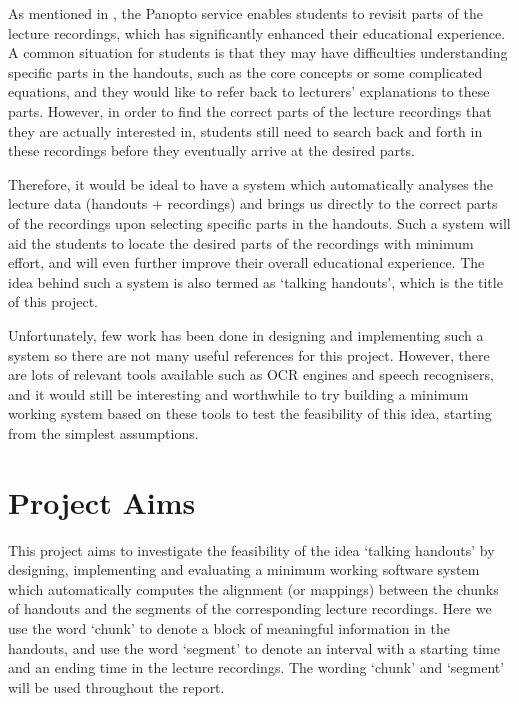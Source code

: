 As mentioned in , the Panopto service enables students to revisit parts of the lecture recordings, which has significantly enhanced their educational experience. A common situation for students is that they may have difficulties understanding specific parts in the handouts, such as the core concepts or some complicated equations, and they would like to refer back to lecturers' explanations to these parts. However, in order to find the correct parts of the lecture recordings that they are actually interested in, students still need to search back and forth in these recordings before they eventually arrive at the desired parts.

Therefore, it would be ideal to have a system which automatically analyses the lecture data (handouts + recordings) and brings us directly to the correct parts of the recordings upon selecting specific parts in the handouts. Such a system will aid the students to locate the desired parts of the recordings with minimum effort, and will even further improve their overall educational experience. The idea behind such a system is also termed as `talking handouts', which is the title of this project.

Unfortunately, few work has been done in designing and implementing such a system so there are not many useful references for this project. However, there are lots of relevant tools available such as OCR engines and speech recognisers, and it would still be interesting and worthwhile to try building a minimum working system based on these tools to test the feasibility of this idea, starting from the simplest assumptions.


\section{Project Aims}
\label{sec:intro-aims}

This project aims to investigate the feasibility of the idea `talking handouts' by designing, implementing and evaluating a minimum working software system which automatically computes the alignment (or mappings) between the chunks of handouts and the segments of the corresponding lecture recordings. Here we use the word `chunk' to denote a block of meaningful information in the handouts, and use the word `segment' to denote an interval with a starting time and an ending time in the lecture recordings. The wording `chunk' and `segment' will be used throughout the report.

